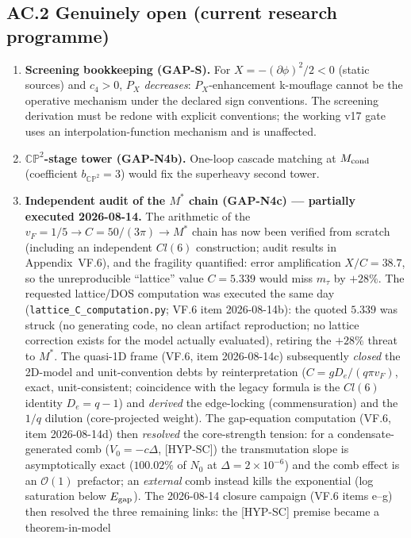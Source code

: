 \subsection*{AC.2 Genuinely open (current research programme)}
\begin{enumerate}
\item \textbf{Screening bookkeeping (GAP-S).} For $X=-(\partial\phi)^2/2<0$ (static sources)
and $c_4>0$, $P_X$ \emph{decreases}: $P_X$-enhancement k-mouflage cannot be the operative
mechanism under the declared sign conventions. The screening derivation must be redone with
explicit conventions; the working v17 gate uses an interpolation-function mechanism and is
unaffected.
\item \textbf{$\mathbb{CP}^2$-stage tower (GAP-N4b).} One-loop cascade matching at
$M_{\rm cond}$ (coefficient $b_{\mathbb{CP}^2}=3$) would fix the superheavy second tower.
\item \textbf{Independent audit of the $M^*$ chain (GAP-N4c) --- partially executed
2026-08-14.} The arithmetic of the $v_F=1/5\to C=50/(3\pi)\to M^*$ chain has now been
verified from scratch (including an independent $Cl(6)$ construction; audit results in
Appendix~VF.6), and the fragility quantified: error amplification $X/C=38.7$, so the
unreproducible ``lattice'' value $C=5.339$ would miss $m_\tau$ by $+28\%$. The requested lattice/DOS computation was executed the same day
(\texttt{lattice\_\allowbreak C\_\allowbreak computation.py}; VF.6 item 2026-08-14b): the quoted $5.339$ was struck
(no generating code, no clean artifact reproduction; no lattice correction exists for the
model actually evaluated), retiring the $+28\%$ threat to $M^*$. The quasi-1D frame (VF.6, item 2026-08-14c) subsequently
\emph{closed} the 2D-model and unit-convention debts by reinterpretation
($C = g D_e/(q\pi v_F)$, exact, unit-consistent; coincidence with the legacy formula is
the $Cl(6)$ identity $D_e = q-1$) and \emph{derived} the edge-locking (commensuration)
and the $1/q$ dilution (core-projected weight). The gap-equation computation (VF.6, item 2026-08-14d) then
\emph{resolved} the core-strength tension: for a condensate-generated comb
($V_0 = -c\Delta$, [HYP-SC]) the transmutation slope is asymptotically exact
($100.02\%$ of $N_0$ at $\Delta = 2\times10^{-6}$) and the comb effect is an
$\mathcal{O}(1)$ prefactor; an \emph{external} comb instead kills the exponential
(log saturation below $E_{\rm gap}$). The 2026-08-14 closure campaign (VF.6 items e--g) then
resolved the three remaining links: the [HYP-SC] premise became a theorem-in-model

\end{enumerate}
